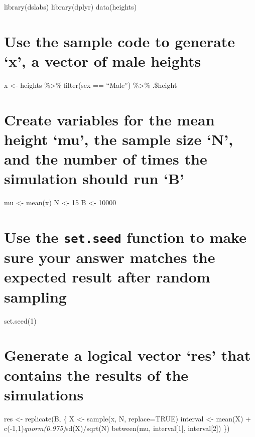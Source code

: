\documentclass[
]{article}
\begin{document}
library(dslabs) library(dplyr) data(heights)

\hypertarget{use-the-sample-code-to-generate-x-a-vector-of-male-heights}{%
\section{Use the sample code to generate `x', a vector of male
heights}\label{use-the-sample-code-to-generate-x-a-vector-of-male-heights}}

x \textless- heights \%\textgreater\% filter(sex == ``Male'')
\%\textgreater\% .\$height

\hypertarget{create-variables-for-the-mean-height-mu-the-sample-size-n-and-the-number-of-times-the-simulation-should-run-b}{%
\section{Create variables for the mean height `mu', the sample size `N',
and the number of times the simulation should run
`B'}\label{create-variables-for-the-mean-height-mu-the-sample-size-n-and-the-number-of-times-the-simulation-should-run-b}}

mu \textless- mean(x) N \textless- 15 B \textless- 10000

\hypertarget{use-the-set.seed-function-to-make-sure-your-answer-matches-the-expected-result-after-random-sampling}{%
\section{\texorpdfstring{Use the \texttt{set.seed} function to make sure
your answer matches the expected result after random
sampling}{Use the set.seed function to make sure your answer matches the expected result after random sampling}}\label{use-the-set.seed-function-to-make-sure-your-answer-matches-the-expected-result-after-random-sampling}}

set.seed(1)

\hypertarget{generate-a-logical-vector-res-that-contains-the-results-of-the-simulations}{%
\section{Generate a logical vector `res' that contains the results of
the
simulations}\label{generate-a-logical-vector-res-that-contains-the-results-of-the-simulations}}

res \textless- replicate(B, \{ X \textless- sample(x, N, replace=TRUE)
interval \textless- mean(X) + c(-1,1)\emph{qnorm(0.975)}sd(X)/sqrt(N)
between(mu, interval{[}1{]}, interval{[}2{]}) \})
\end{document}

